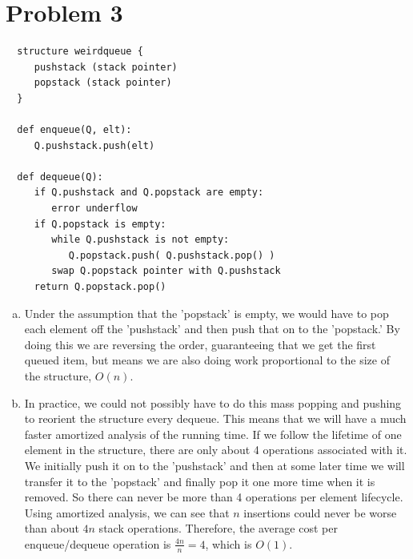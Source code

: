 \documentclass[a4paper,12pt]{article}
\begin{document}
\section*{Problem 3}


\begin{verbatim}
  structure weirdqueue {
     pushstack (stack pointer)
     popstack (stack pointer)
  }

  def enqueue(Q, elt):
     Q.pushstack.push(elt)

  def dequeue(Q):
     if Q.pushstack and Q.popstack are empty:
        error underflow
     if Q.popstack is empty:
        while Q.pushstack is not empty:
           Q.popstack.push( Q.pushstack.pop() )
        swap Q.popstack pointer with Q.pushstack
     return Q.popstack.pop()

\end{verbatim}


\begin{enumerate}[a)]

\item Under the assumption that the 'popstack' is empty, we would have
  to pop each element off the 'pushstack' and then push that on to the
  'popstack.' By doing this we are reversing the order, guaranteeing
  that we get the first queued item, but means we are also doing work
  proportional to the size of the structure, $O(n)$.

\item In practice, we could not possibly have to do this mass popping
  and pushing to reorient the structure every dequeue. This means that
  we will have a much faster amortized analysis of the running
  time. If we follow the lifetime of one element in the structure,
  there are only about 4 operations associated with it. We initially
  push it on to the 'pushstack' and then at some later time we will
  transfer it to the 'popstack' and finally pop it one more time when
  it is removed. So there can never be more than 4 operations per
  element lifecycle. Using amortized analysis, we can see that $n$
  insertions could never be worse than about $4n$ stack
  operations. Therefore, the average cost per enqueue/dequeue
  operation is $\frac{4n}{n} = 4$, which is $O(1)$.
  
\end{enumerate}
\end{document}
